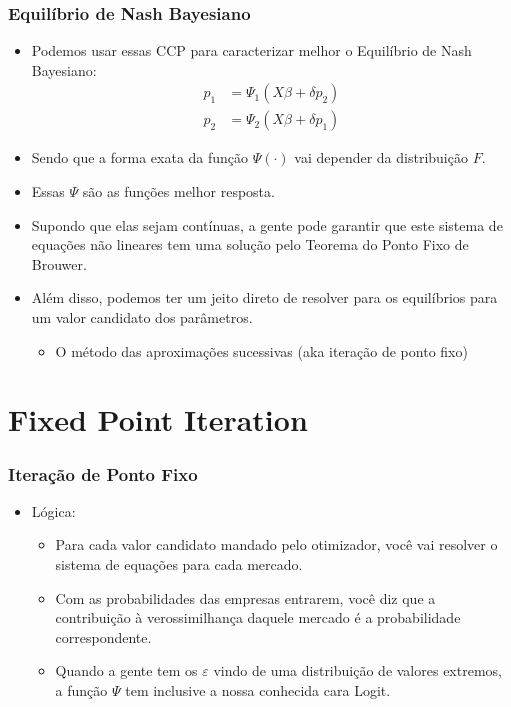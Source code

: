 \documentclass{beamer}
\begin{document}
\begin{frame}[fragile]\frametitle{Equilíbrio de Nash Bayesiano}
    \begin{itemize}
    	\item Podemos usar essas CCP para caracterizar melhor o Equilíbrio de Nash Bayesiano:
		\begin{align*}
		p_{1} &= \Psi_{1}(X\beta + \delta p_{2}) \\
		p_{2} &= \Psi_{2}(X\beta + \delta p_{1})
		\end{align*}
		\item Sendo que a forma exata da função $\Psi(\cdot)$ vai depender da distribuição $F$. 
		\item Essas $\Psi$ são as funções melhor resposta.
		\item Supondo que elas sejam contínuas, a gente pode garantir que este sistema de equações não lineares tem uma solução pelo Teorema do Ponto Fixo de Brouwer.
		\item Além disso, podemos ter um jeito direto de resolver para os equilíbrios para um valor candidato dos parâmetros.
		\begin{itemize}
			\item O método das aproximações sucessivas (aka iteração de ponto fixo)
		\end{itemize}
    \end{itemize}
\end{frame}

\section{Fixed Point Iteration}

\begin{frame}[fragile]\frametitle{Iteração de Ponto Fixo}
\begin{itemize}
	\item Lógica:
	\begin{itemize}
		\item Para cada valor candidato mandado pelo otimizador, você vai resolver o sistema de equações para cada mercado.
		\item Com as probabilidades das empresas entrarem, você diz que a contribuição à verossimilhança daquele mercado é a probabilidade correspondente.
		\item Quando a gente tem os $\varepsilon$ vindo de uma distribuição de valores extremos, a função $\Psi$ tem inclusive a nossa conhecida cara Logit.
	\end{itemize}
\end{itemize}
   
\end{frame}
\end{document}

